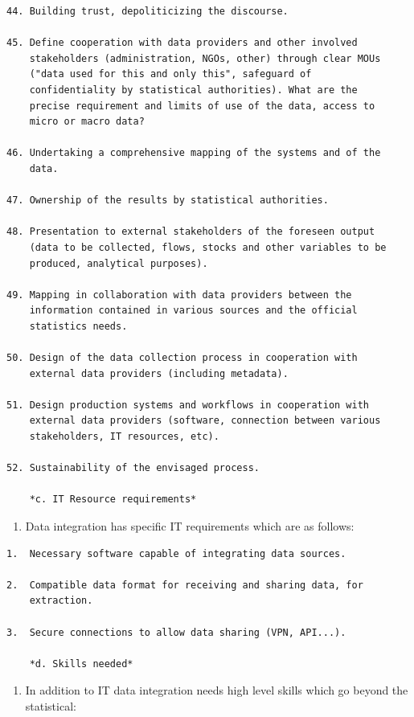 \documentclass[
]{article}
\providecommand{\tightlist}{%
  \setlength{\itemsep}{0pt}\setlength{\parskip}{0pt}}
\begin{document}
\begin{verbatim}
44. Building trust, depoliticizing the discourse.

45. Define cooperation with data providers and other involved
    stakeholders (administration, NGOs, other) through clear MOUs
    ("data used for this and only this", safeguard of
    confidentiality by statistical authorities). What are the
    precise requirement and limits of use of the data, access to
    micro or macro data?

46. Undertaking a comprehensive mapping of the systems and of the
    data.

47. Ownership of the results by statistical authorities.

48. Presentation to external stakeholders of the foreseen output
    (data to be collected, flows, stocks and other variables to be
    produced, analytical purposes).

49. Mapping in collaboration with data providers between the
    information contained in various sources and the official
    statistics needs.

50. Design of the data collection process in cooperation with
    external data providers (including metadata).

51. Design production systems and workflows in cooperation with
    external data providers (software, connection between various
    stakeholders, IT resources, etc).

52. Sustainability of the envisaged process.

    *c. IT Resource requirements*
\end{verbatim}

\begin{enumerate}
\def\labelenumi{\arabic{enumi}.}
\setcounter{enumi}{207}
\tightlist
\item
  Data integration has specific IT requirements which are as follows:
\end{enumerate}

\begin{verbatim}
1.  Necessary software capable of integrating data sources.

2.  Compatible data format for receiving and sharing data, for
    extraction.

3.  Secure connections to allow data sharing (VPN, API...).

    *d. Skills needed*
\end{verbatim}

\begin{enumerate}
\def\labelenumi{\arabic{enumi}.}
\setcounter{enumi}{208}
\tightlist
\item
  In addition to IT data integration needs high level skills which go
  beyond the statistical:
\end{enumerate}
\end{document}
